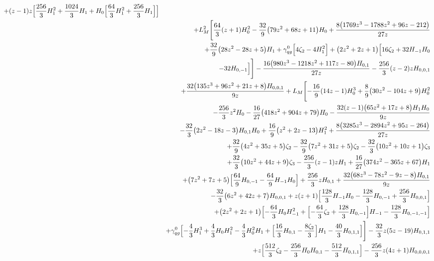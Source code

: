 \begin{eqnarray}
+(z-1) z
\Bigl[\frac{256}{3}  H_1^2+\frac{1024}{3}  H_1+H_0
\Bigl[\frac{64}{3} H_1^2+\frac{256}{3}  H_1\Bigr]\Bigr]
\nonumber \\ &&
+
L_M^2 \Biggl[\frac{64}{3} (z+1) H_0^2-\frac{32}{9} \big(79
z^2+68 z+11\big) H_0+\frac{8 \big(1769 z^3-1788 z^2+96 z-212\big)}{27
  z}
\nonumber \\ &&
+\frac{32}{9} \big(28 z^2-28 z+5\big) H_1+{\gamma}_{qg}^{0} \Bigl[4
\zeta_2-4 H_1^2\Bigr]+\big(2 z^2+2 z+1\big) \Bigl[16  \zeta_2+32
 H_{-1} H_0
\nonumber \\ &&
-32  H_{0,-1}\Bigr]\Biggr]
-\frac{16 \big(980 z^3-1218
  z^2+117 z-80\big) H_{0,1}}{27 z}-\frac{256}{3}  (z-2) z
H_{0,0,1}
\nonumber \\ &&
+\frac{32 \big(135 z^3+96 z^2+21 z+8\big) H_{0,0,1}}{9 z}
+L_M \Biggl[-\frac{16}{9} (14 z-1) H_0^3+\frac{8}{9}\big(30 z^2-104 z+9\big) H_0^2
\nonumber \\ &&
-\frac{256}{3}  z^2 H_0-\frac{16}{27}\big(418 z^2+904 z+79\big) H_0-\frac{32 (z-1) \big(65 z^2+17 z+8\big) H_1  H_0}{9 z}
\nonumber \\ &&
-\frac{32}{3} \big(2 z^2-18 z-3\big) H_{0,1} H_0+\frac{16}{9}\big(z^2+2 z-13\big) H_1^2+\frac{8 \big(3285 z^3-2894 z^2+95 z-264\big)}{27  z}
\nonumber \\ &&
+\frac{32}{9} \big(4 z^2+35 z+5\big) \zeta_2-\frac{32}{9} \big(7 z^2+31 z+5\big) \zeta_2-\frac{32}{3}  \big(10 z^2+10z+1\big) \zeta_3
\nonumber \\ &&
+\frac{32}{3} \big(10 z^2+44 z+9\big) \zeta_3-\frac{256}{3}  (z-1) z H_1+\frac{16}{27} \big(374 z^2-365 z+67\big)H_1
\nonumber \\ &&
+\big(7 z^2+7 z+5\big) \Bigl[\frac{64}{9}  H_{0,-1}-\frac{64}{9} H_{-1} H_0\Bigr]+\frac{256}{3}  z H_{0,1}
+\frac{32 \big(68 z^3-78  z^2-9 z-8\big) H_{0,1}}{9 z}
\nonumber \\ &&
-\frac{32}{3} \big(6 z^2+42 z+7\big) H_{0,0,1}
+z (z+1) \Bigl[\frac{128}{3}H_{-1} H_0-\frac{128}{3} H_{0,-1}+\frac{256}{3}  H_{0,0,1}\Bigr]
\nonumber \\ &&
+\big(2z^2+2 z+1\big) \Bigl[-\frac{64}{3} H_0 H_{-1}^2+\Bigl[-\frac{64}{3} \zeta_2+\frac{128}{3} H_{0,-1}
\Bigr]H_{-1}-\frac{128}{3}H_{0,-1,-1}
\Bigr]
\nonumber \\ &&
+{\gamma}_{qg}^{0} \Bigl[-\frac{4}{3} H_1^3+\frac{4}{3}H_0 H_1^2-\frac{4}{3} H_0^2 H_1+\Bigl[\frac{16}{3} H_{0,1}-\frac{8 \zeta_2}{3}\Bigr] H_1-\frac{40}{3} H_{0,1,1}\Bigr]\Biggr]
-\frac{32}{3} z (5 z-19)H_{0,1,1}
\nonumber \\ &&
+z \Bigl[\frac{512}{3}  \zeta_2-\frac{256}{3}  H_0H_{0,1}-\frac{512}{3}  H_{0,1,1}\Bigr]-\frac{256}{3} z (4 z+1)H_{0,0,0,1}

\end{eqnarray}
